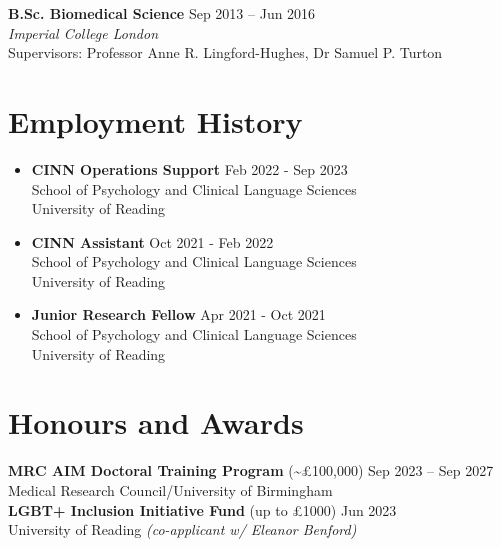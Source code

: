 \documentclass[a4paper,10pt]{article}
\makeatletter
\newcommand{\resumeItem}[1]{
  \item\small{
    {#1 \vspace{-2pt}}
  }
}
\newcommand{\resumeSubheading}[4]{
  \vspace{-0pt}\item
  \begin{minipage}{\textwidth}
    \textbf{#1} \hfill #2 \\
    #3 \\
    #4
  \end{minipage}\vspace{-7pt}
}
\newcommand{\resumeSubSubheading}[2]{
    \item
    \begin{tabular*}{0.97\textwidth}{l@{\extracolsep{\fill}}r}
      \textit{\small#1} & \textit{\small #2} \\
    \end{tabular*}\vspace{-7pt}
}
\newcommand{\resumeSubHeadingListStart}{\begin{itemize}[left=-0.06in, label={}, itemsep=-5pt]}
\newcommand{\resumeSubHeadingListEnd}{\end{itemize}}
\newcommand{\resumeItemListStart}{\begin{itemize}}
\newcommand{\resumeItemListEnd}{\end{itemize}\vspace{-5pt}}
\makeatother
\begin{document}
\vspace{8pt}

\begin{adjustwidth}{0em}{0pt}
\textbf{B.Sc. Biomedical Science} \hfill{Sep 2013 -- Jun 2016} \\
\emph{Imperial College London} \\
Supervisors: Professor Anne R. Lingford-Hughes, Dr Samuel P. Turton
\end{adjustwidth}



\section{Employment History}
\vspace{2pt}
  \resumeSubHeadingListStart
\resumeSubheading
  {CINN Operations Support}{Feb 2022 - Sep 2023}{School of Psychology and Clinical Language Sciences}{University of Reading}
\vspace{8pt} 
\resumeSubheading
  {CINN Assistant}{Oct 2021 - Feb 2022}{School of Psychology and Clinical Language Sciences}{University of Reading}
\vspace{8pt} 
\resumeSubheading
  {Junior Research Fellow}{Apr 2021 - Oct 2021}{School of Psychology and Clinical Language Sciences}{University of Reading}
\vspace{4pt} 
  \resumeSubHeadingListEnd
  
\section{Honours and Awards}
\vspace{2pt}
\textbf{MRC AIM Doctoral Training Program} (\textasciitilde £100,000) \hfill Sep 2023 -- Sep 2027 \\
Medical Research Council/University of Birmingham \\
\vspace{8pt} 
\textbf{LGBT+ Inclusion Initiative Fund} (up to £1000) \hfill Jun 2023\\
University of Reading \textit{(co-applicant w/ Eleanor Benford)}
\end{document}
